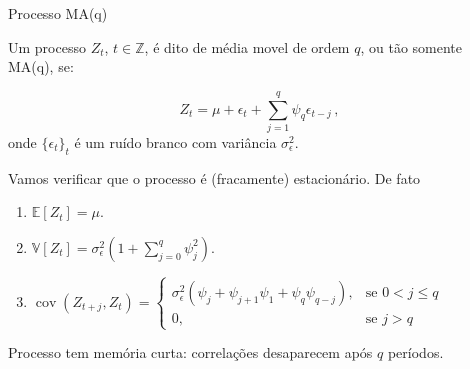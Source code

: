 \documentclass[11pt]{beamer}
\newenvironment{halfwideitemize}{\itemize\addtolength{\itemsep}{0.5em}}{\enditemize}
\begin{document}
\begin{frame}{Processo  MA(q)}
	\begin{halfwideitemize}
			\item Um processo $Z_t$, $t \in \mathbb{Z}$, é dito de média movel de ordem $q$, ou tão somente MA(q), se:
			
			$$Z_t = \mu + \epsilon_t + \sum_{j=1}^{q} \psi_q \epsilon_{t-j} \, ,$$
			onde $\{\epsilon_t\}_t$ é um ruído branco com variância $\sigma^2_\epsilon$.
			\item Vamos verificar que o processo é (fracamente) estacionário. De fato
			\begin{enumerate}
				\item 			$\mathbb{E}[Z_t] = \mu $.
				\item $\mathbb{V}[Z_t] = \sigma^2_\epsilon(1+ \sum_{j=0}^q\psi^2_j)$.
				\item $\operatorname{cov}( Z_{t+j}, Z_t) = \begin{cases}
					\sigma^2_\epsilon (\psi_{j} + \psi_{j+1}\psi_1 + \psi_q \psi_{q-j}), & \text{se } 0 < j  \leq q \\
					0,& \text{se } j  > q
				\end{cases}$
			\end{enumerate}
			\item Processo tem memória curta: correlações desaparecem após $q$ períodos.
	\end{halfwideitemize}
\end{frame}
\end{document}
